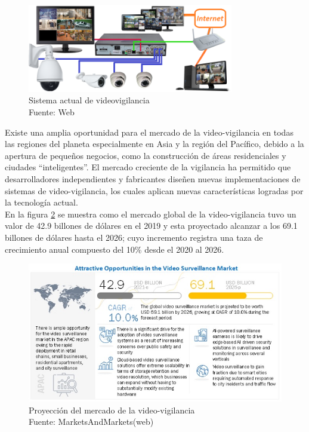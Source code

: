 \begin{figure}[H]
    \begin{center}
        \includegraphics[width=9cm]{img/capitulo_2/sis_videovigilancia.png}
    \end{center}
    \caption{Sistema actual de videovigilancia\\Fuente: Web}
    \label{fig:sistema_video_vigilancia}
\end{figure}

Existe una amplia oportunidad para el mercado de la video-vigilancia en todas las regiones del planeta especialmente en Asia y la región del Pacífico, debido a la apertura de pequeños negocios, como la construcción de áreas residenciales y ciudades ``inteligentes''. El mercado creciente de la vigilancia ha permitido que desarrolladores independientes y fabricantes diseñen nuevas implementaciones de sistemas de video-vigilancia, los cuales aplican nuevas características logradas por la tecnología actual.\\

En la figura \ref{fig:surveillance-market} se muestra como el mercado global de la video-vigilancia tuvo un valor de 42.9 billones de dólares en el 2019 y esta proyectado alcanzar a los 69.1 billones de dólares hasta el 2026; cuyo incremento registra una taza de crecimiento anual compuesto del 10\% desde el 2020 al 2026. \cite{marketsandmarkets:market-surveillance}\\

\begin{figure}[H]
    \begin{center}
        \includegraphics[width=13cm]{img/capitulo_2/surveillance-market.jpg}
    \end{center}
    \caption{Proyección del mercado de la video-vigilancia\\Fuente: MarketsAndMarkets(web)}
    \label{fig:surveillance-market}
\end{figure}

